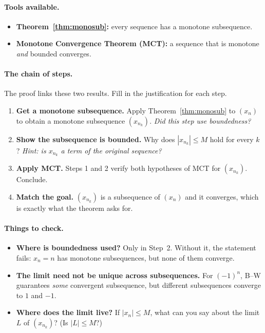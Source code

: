 \documentclass[11pt]{article}
\theoremstyle{definition}
\begin{document}
\paragraph{Tools available.}
\begin{itemize}[nosep]
  \item \textbf{Theorem~\ref{thm:monosub}:} every sequence has a monotone
        subsequence.
  \item \textbf{Monotone Convergence Theorem (MCT):} a sequence that is
        monotone \emph{and} bounded converges.
\end{itemize}

\paragraph{The chain of steps.}
The proof links these two results. Fill in the justification for each step.
\begin{enumerate}
  \item \textbf{Get a monotone subsequence.} Apply
        Theorem~\ref{thm:monosub} to $(x_n)$ to obtain a monotone
        subsequence $(x_{n_k})$.
        \emph{Did this step use boundedness?}
  \item \textbf{Show the subsequence is bounded.} Why does
        $|x_{n_k}|\le M$ hold for every $k$?
        \emph{Hint: is $x_{n_k}$ a term of the original sequence?}
  \item \textbf{Apply MCT.} Steps 1 and 2 verify both hypotheses of MCT
        for $(x_{n_k})$. Conclude.
  \item \textbf{Match the goal.} $(x_{n_k})$ is a subsequence of $(x_n)$
        and it converges, which is exactly what the theorem asks for.
\end{enumerate}

\paragraph{Things to check.}
\begin{itemize}[nosep]
  \item \textbf{Where is boundedness used?} Only in Step~2. Without it,
        the statement fails: $x_n=n$ has monotone subsequences, but none
        of them converge.
  \item \textbf{The limit need not be unique across subsequences.} For
        $(-1)^n$, B--W guarantees \emph{some} convergent subsequence, but
        different subsequences converge to $1$ and $-1$.
  \item \textbf{Where does the limit live?} If $|x_n|\le M$, what can you
        say about the limit $L$ of $(x_{n_k})$? (Is $|L|\le M$?)
\end{itemize}
\end{document}
